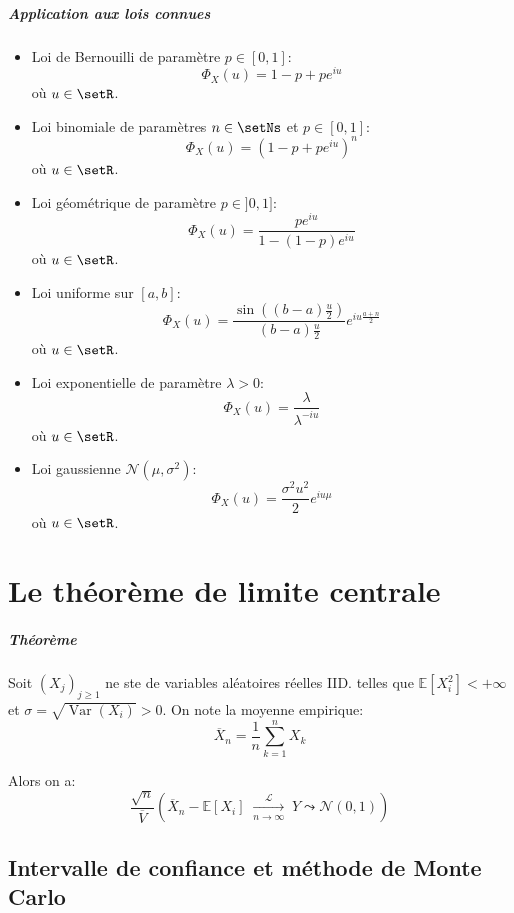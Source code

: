 \documentclass[a4paper,10pt,french,openany]{memoir}
\newcommand{\Esper}{\mathbb{E}}
\newcommand{\normale}{\mathcal{N}}
\DeclareMathOperator{\Var}{Var}
\begin{document}
\paragraph{Application aux lois connues}
\begin{itemize}
 \item Loi de Bernouilli de paramètre $p\in[0,1]$:
 \[ \Phi_X(u) = 1-p+pe^{iu} \] où $u\in\setR$.
 
 \item Loi binomiale de paramètres $n\in\setNs$ et $p\in[0,1]$:
 \[ \Phi_X(u) = (1-p + pe^{iu})^n \] où $u\in\setR$.
 
 \item Loi géométrique de paramètre $p\in]0,1]$:
 \[ \Phi_X(u) = \frac{pe^{iu}}{1-(1-p)e^{iu}} \] où $u\in\setR$.
 
 \item Loi uniforme sur $[a,b]$:
 \[ \Phi_X(u) = \frac{\sin((b-a)\frac u 2)}{(b-a)\frac u 2} e^{iu \frac{a+n}2} \] où $u\in\setR$.
 
 \item Loi exponentielle de paramètre $\lambda>0$:
 \[ \Phi_X(u) = \frac \lambda {\lambda^{-iu}} \] où $u\in\setR$.
 
 \item Loi gaussienne $\normale(\mu, \sigma^2)$:
 \[ \Phi_X(u) = \frac{\sigma^2 u^2}2 e^{iu\mu} \] où $u\in\setR$.
\end{itemize}

\chapter{Le théorème de limite centrale}

\paragraph{Théorème}
Soit $(X_j)_{j\geq1}$ ne ste de variables aléatoires réelles IID. telles que $\Esper[X_i^2]<+\infty$ et $\sigma=\sqrt{\Var(X_i)} > 0$. On note la moyenne empirique: \[\overline X_n = \frac1n \sum_{k=1}^n X_k\]

Alors on a:
\[\frac{\sqrt n}{\overline V} \left(\overline X_n - \Esper[X_i]\; \underset{n\to\infty}{\overset{\mathcal{L}}\to} \;Y \leadsto \normale(0, 1)\right)\]

\section{Intervalle de confiance et méthode de Monte Carlo}
\end{document}
